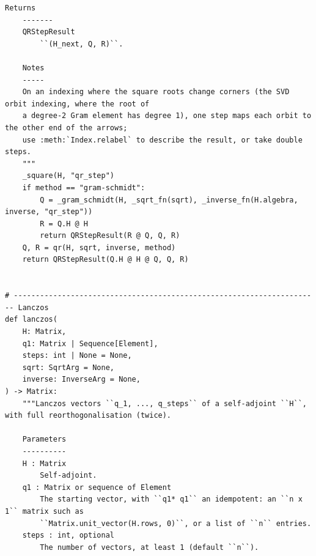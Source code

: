 \documentclass[12pt, a4paper]{report}
\theoremstyle{plain}
\theoremstyle{definition}
\theoremstyle{remark}
\theoremstyle{plain}
\begin{document}
\begin{lstlisting}[style=dsqcode]
    Returns
    -------
    QRStepResult
        ``(H_next, Q, R)``.

    Notes
    -----
    On an indexing where the square roots change corners (the SVD orbit indexing, where the root of
    a degree-2 Gram element has degree 1), one step maps each orbit to the other end of the arrows;
    use :meth:`Index.relabel` to describe the result, or take double steps.
    """
    _square(H, "qr_step")
    if method == "gram-schmidt":
        Q = _gram_schmidt(H, _sqrt_fn(sqrt), _inverse_fn(H.algebra, inverse, "qr_step"))
        R = Q.H @ H
        return QRStepResult(R @ Q, Q, R)
    Q, R = qr(H, sqrt, inverse, method)
    return QRStepResult(Q.H @ H @ Q, Q, R)


# ---------------------------------------------------------------------- Lanczos
def lanczos(
    H: Matrix,
    q1: Matrix | Sequence[Element],
    steps: int | None = None,
    sqrt: SqrtArg = None,
    inverse: InverseArg = None,
) -> Matrix:
    """Lanczos vectors ``q_1, ..., q_steps`` of a self-adjoint ``H``, with full reorthogonalisation (twice).

    Parameters
    ----------
    H : Matrix
        Self-adjoint.
    q1 : Matrix or sequence of Element
        The starting vector, with ``q1* q1`` an idempotent: an ``n x 1`` matrix such as
        ``Matrix.unit_vector(H.rows, 0)``, or a list of ``n`` entries.
    steps : int, optional
        The number of vectors, at least 1 (default ``n``).


\end{lstlisting}
\end{document}
